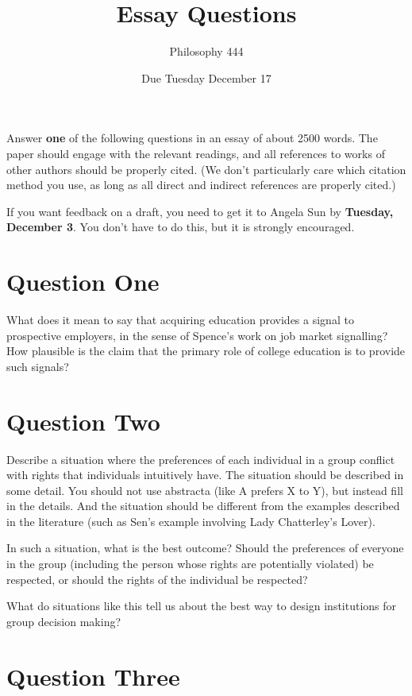 \documentclass[11pt,]{article}
\title{Essay Questions}
\author{Philosophy 444}
\date{Due Tuesday December 17}
\begin{document}
\maketitle

Answer \textbf{one} of the following questions in an essay of about 2500
words. The paper should engage with the relevant readings, and all
references to works of other authors should be properly cited. (We don't
particularly care which citation method you use, as long as all direct
and indirect references are properly cited.)

If you want feedback on a draft, you need to get it to Angela Sun by
\textbf{Tuesday, December 3}. You don't have to do this, but it is
strongly encouraged.

\hypertarget{question-one}{%
\section{Question One}\label{question-one}}

What does it mean to say that acquiring education provides a signal to
prospective employers, in the sense of Spence's work on job market
signalling? How plausible is the claim that the primary role of college
education is to provide such signals?

\hypertarget{question-two}{%
\section{Question Two}\label{question-two}}

Describe a situation where the preferences of each individual in a group
conflict with rights that individuals intuitively have. The situation
should be described in some detail. You should not use abstracta (like A
prefers X to Y), but instead fill in the details. And the situation
should be different from the examples described in the literature (such
as Sen's example involving Lady Chatterley's Lover).

In such a situation, what is the best outcome? Should the preferences of
everyone in the group (including the person whose rights are potentially
violated) be respected, or should the rights of the individual be
respected?

What do situations like this tell us about the best way to design
institutions for group decision making?

\hypertarget{question-three}{%
\section{Question Three}\label{question-three}}
\end{document}
